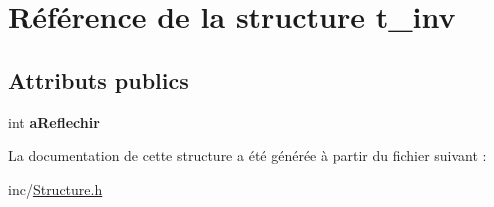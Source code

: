\hypertarget{structt__inv}{}\section{Référence de la structure t\+\_\+inv}
\label{structt__inv}
\subsection*{Attributs publics}
\begin{DoxyCompactItemize}
\item 
\hypertarget{structt__inv_ae4dc7520b21dceed07e8cbadd4649f1b}{}int {\bfseries a\+Reflechir}\label{structt__inv_ae4dc7520b21dceed07e8cbadd4649f1b}

\end{DoxyCompactItemize}


La documentation de cette structure a été générée à partir du fichier suivant \+:\begin{DoxyCompactItemize}
\item 
inc/\hyperlink{Structure_8h}{Structure.\+h}\end{DoxyCompactItemize}
